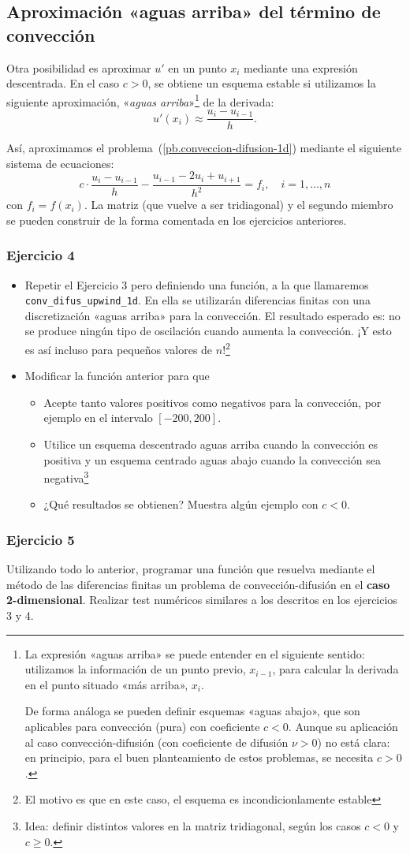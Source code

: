 \documentclass[11pt,spanish,a4wide]{article}
\begin{document}
\subsection{Aproximación «aguas arriba» del término de convección}
Otra posibilidad es aproximar $u'$ en un punto $x_i$ mediante una
expresión descentrada. En el caso $c>0$, se obtiene un esquema estable
si utilizamos la siguiente aproximación, «\textit{aguas
  arriba}»\footnote{La expresión «aguas arriba» se puede entender en
  el siguiente sentido: utilizamos la información de un punto previo,
  $x_{i-1}$, para calcular la derivada en el punto situado «más
  arriba», $x_i$. \par De forma análoga se pueden definir esquemas «aguas
  abajo», que son aplicables para convección (pura) con coeficiente
  $c<0$. Aunque su aplicación al caso convección-difusión (con
  coeficiente de difusión $\nu>0$) no está
  clara: en principio, para el buen planteamiento de estos problemas,
  se necesita $c>0$. }  de la derivada:
$$ u'(x_i) \approx \frac{u_{i}-u_{i-1}}{h}.
$$

Así, aproximamos el problema~(\ref{pb.conveccion-difusion-1d})
mediante el siguiente sistema de ecuaciones:
$$
c\cdot \frac{u_{i}-u_{i-1}}{h} -\frac{u_{i-1}-2u_i + u_{i+1}}{h^2}
= f_i, \quad i=1,\dots,n
$$
con $f_i=f(x_i)$. La matriz (que vuelve a ser tridiagonal) y el
segundo miembro se pueden construir de la forma comentada en los
ejercicios anteriores.

\subsubsection{Ejercicio 4}
\begin{itemize}
\item Repetir el Ejercicio 3 pero definiendo una función, a la que
  llamaremos \texttt{conv\_difus\_upwind\_1d}. En ella se utilizarán
  diferencias finitas con una discretización «aguas arriba» para la
  convección. El resultado esperado es: no se produce ningún tipo de
  oscilación cuando aumenta la convección. ¡Y esto es así incluso para
  pequeños valores de $n$!\footnote{El motivo es que en este caso, el
    esquema es incondicionlamente estable}
\item Modificar la función anterior para que
  \begin{itemize}
  \item Acepte tanto valores positivos como negativos para la
    convección, por ejemplo en el intervalo $[-200,200]$.
  \item Utilice un esquema descentrado aguas arriba cuando la convección
    es positiva y un esquema centrado aguas abajo cuando la convección
    sea negativa\footnote{Idea: definir distintos valores en la matriz
      tridiagonal, según los casos $c<0$ y $c\ge 0$.}
  \item ¿Qué resultados se obtienen? Muestra algún ejemplo con $c<0$.
  \end{itemize}
\end{itemize}

\subsubsection{Ejercicio 5}
Utilizando todo lo anterior, programar una función que resuelva
mediante el método de las diferencias finitas un problema de
convección-difusión en el \textbf{caso 2-dimensional}. Realizar test
numéricos similares a los descritos en los ejercicios 3 y 4.
\end{document}
